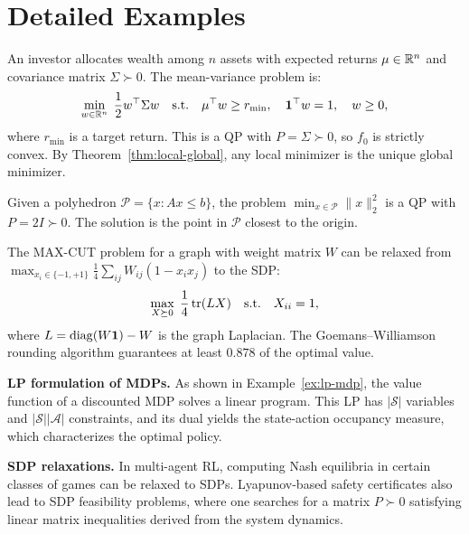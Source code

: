 \documentclass[11pt,a4paper]{article}
\begin{document}

\section{Detailed Examples}\label{sec:examples}

\begin{example}\label{ex:portfolio}
An investor allocates wealth among $n$ assets with expected returns
$\mu \in \mathbb{R}^n$ and covariance matrix $\Sigma \succ 0$. The
mean-variance problem is:
\[
  \min_{w \in \mathbb{R}^n} \; \frac{1}{2} w^\top \Sigma w \quad
  \text{s.t.} \quad \mu^\top w \ge r_{\min}, \quad
  \mathbf{1}^\top w = 1, \quad w \ge 0,
\]
where $r_{\min}$ is a target return. This is a QP with $P = \Sigma \succ 0$,
so $f_0$ is strictly convex. By Theorem~\ref{thm:local-global}, any local
minimizer is the unique global minimizer.
\end{example}

\begin{example}\label{ex:min-norm}
Given a polyhedron $\mathcal{P} = \{x : Ax \le b\}$, the problem
$\min_{x \in \mathcal{P}} \|x\|_2^2$ is a QP with $P = 2I \succ 0$.
The solution is the point in $\mathcal{P}$ closest to the origin.
\end{example}

\begin{example}\label{ex:sdp-relax}
The MAX-CUT problem for a graph with weight matrix $W$ can be relaxed from
$\max_{x_i \in \{-1,+1\}} \frac{1}{4} \sum_{ij} W_{ij}(1 - x_i x_j)$
to the SDP:
\[
  \max_{X \succeq 0} \; \frac{1}{4} \operatorname{tr}(L X) \quad \text{s.t.} \quad
  X_{ii} = 1,
\]
where $L = \operatorname{diag}(W\mathbf{1}) - W$ is the graph Laplacian.
The Goemans--Williamson rounding algorithm guarantees at least $0.878$ of
the optimal value.
\end{example}

\begin{rlconnection}
\textbf{LP formulation of MDPs.} As shown in Example~\ref{ex:lp-mdp}, the
value function of a discounted MDP solves a linear program. This LP has
$|\mathcal{S}|$ variables and $|\mathcal{S}||\mathcal{A}|$ constraints, and
its dual yields the state-action occupancy measure, which characterizes
the optimal policy.

\textbf{SDP relaxations.} In multi-agent RL, computing Nash equilibria
in certain classes of games can be relaxed to SDPs. Lyapunov-based safety
certificates also lead to SDP feasibility problems, where one searches
for a matrix $P \succ 0$ satisfying linear matrix inequalities derived
from the system dynamics.
\end{rlconnection}
\end{document}
